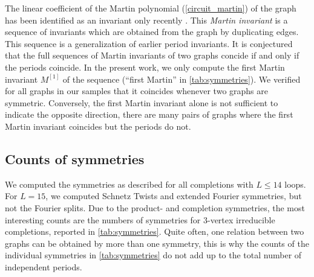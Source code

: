 \documentclass[12pt,a4paper]{article}
\renewcommand{\|}{\rule[-0.4ex]{0.2ex}{1.2em}}
\begin{document}
The linear coefficient of the Martin polynomial (\cref{circuit_martin}) of the graph has been identified as an invariant only recently  \cite{panzer_feynman_2023}. This \emph{Martin invariant} is a sequence of invariants which are obtained from the graph by duplicating edges. This sequence is a generalization of earlier period invariants. It is conjectured \cite{panzer_feynman_2023} that the full sequences of Martin invariants  of two graphs concide if and only if the periods coincide. In the present work, we only compute  the first Martin invariant $M^{[1]}$ of the sequence (\enquote{first Martin} in \cref{tab:symmetries}). We verified for all graphs in our samples that it coincides whenever two graphs are symmetric. Conversely, the first Martin invariant alone is not sufficient to indicate the opposite direction, there are many pairs of graphs where the first Martin invariant coincides but the periods do not.  





\subsection{Counts of symmetries}\label{sec:symmetries_count}

We computed the symmetries as described for all completions with $L \leq 14$ loops. For $L=15$, we computed Schnetz Twists and extended Fourier symmetries, but not the Fourier splits. Due to the product- and completion symmetries, the most interesting counts are the numbers of symmetries for 3-vertex irreducible completions, reported in \cref{tab:symmetries}. Quite often, one relation between two graphs can be obtained by more than one symmetry, this is why the counts of the individual symmetries in \cref{tab:symmetries} do not add up to the total number of independent periods.
\end{document}
